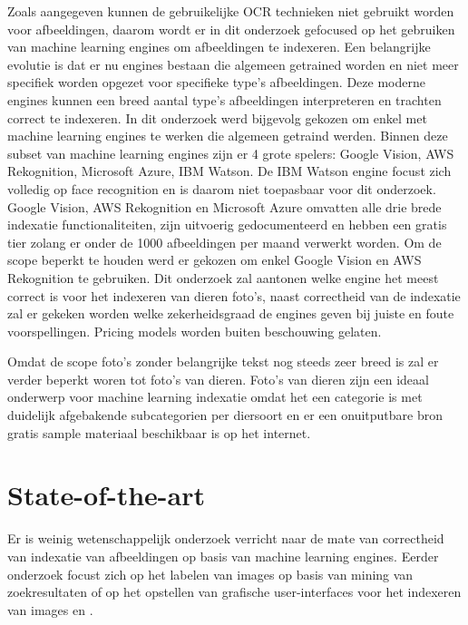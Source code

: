 Zoals aangegeven kunnen de gebruikelijke OCR technieken niet gebruikt worden voor afbeeldingen, daarom wordt er in dit onderzoek gefocused op het gebruiken van machine learning engines om afbeeldingen te indexeren. Een belangrijke evolutie is dat er nu engines bestaan die algemeen getrained worden en niet meer specifiek worden opgezet voor specifieke type's afbeeldingen. Deze moderne engines kunnen een breed aantal type's afbeeldingen interpreteren en trachten correct te indexeren.
In dit onderzoek werd bijgevolg gekozen om enkel met machine learning engines te werken die algemeen getraind werden. Binnen deze subset van machine learning engines zijn er 4 grote spelers: Google Vision, AWS Rekognition, Microsoft Azure, IBM Watson. De IBM Watson engine focust zich volledig op face recognition en is daarom niet toepasbaar voor dit onderzoek. Google Vision, AWS Rekognition en Microsoft Azure omvatten alle drie brede indexatie functionaliteiten, zijn uitvoerig gedocumenteerd en hebben een gratis tier zolang er onder de 1000 afbeeldingen per maand verwerkt worden. Om de scope beperkt te houden werd er gekozen om enkel Google Vision en AWS Rekognition te gebruiken.
Dit onderzoek zal aantonen welke engine het meest correct is voor het indexeren van dieren foto's, naast correctheid van de indexatie zal er gekeken worden welke zekerheidsgraad de engines geven bij juiste en foute voorspellingen. Pricing models worden buiten beschouwing gelaten.

Omdat de scope foto's zonder belangrijke tekst nog steeds zeer breed is zal er verder beperkt woren tot foto's van dieren. Foto's van dieren zijn een ideaal onderwerp voor machine learning indexatie omdat het een categorie is met duidelijk afgebakende subcategorien per diersoort en er een onuitputbare bron gratis sample materiaal beschikbaar is op het internet.


\section{State-of-the-art}
\label{sec:state-of-the-art}

Er is weinig wetenschappelijk onderzoek verricht naar de mate van correctheid van indexatie van afbeeldingen op basis van machine learning engines. Eerder onderzoek focust zich op het labelen van images op basis van mining van zoekresultaten \autocite{Wang2008} of op het opstellen van grafische user-interfaces voor het indexeren van images \autocite{LuisvonAhn2004} en \autocite{JuliaMoehrmann2012}.


